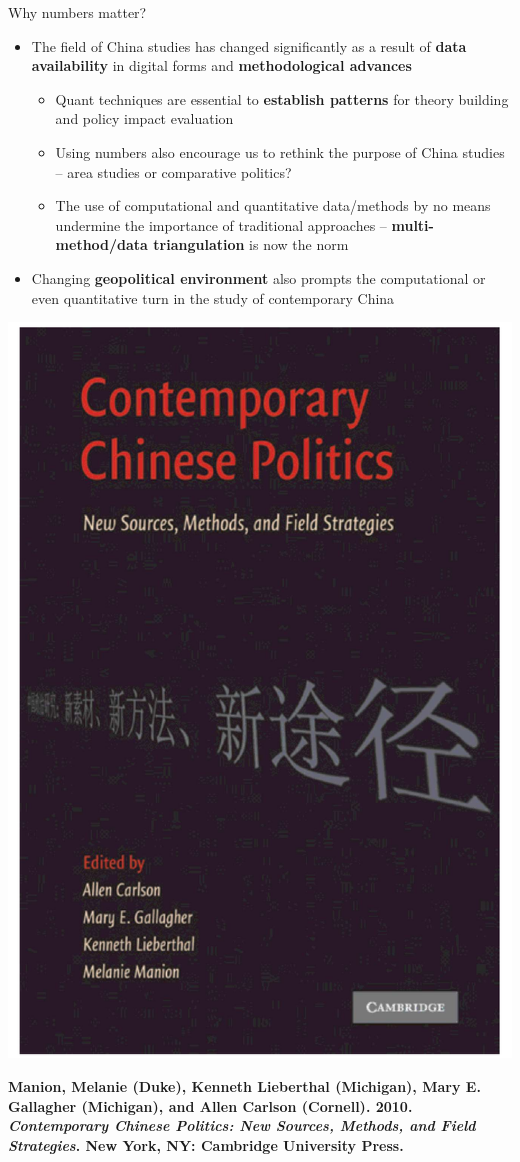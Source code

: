 \documentclass[
  10pt,
  ignorenonframetext,
]{beamer}
\begin{document}
\begin{frame}{Why numbers matter?}
\label{why-numbers-matter}
\begin{itemize}
\small
  \item The field of China studies has changed significantly as a result of \textbf{data availability} in digital forms and \textbf{methodological advances} 
  \vspace{0.1cm}
  \begin{itemize}
    \item Quant techniques are essential to \textbf{establish patterns} for theory building and policy impact evaluation
    \item Using numbers also encourage us to rethink the purpose of China studies -- area studies or comparative politics?
    \item The use of computational and quantitative data/methods by no means undermine the importance of traditional approaches -- \textbf{multi-method/data triangulation} is now the norm
  \end{itemize}
  \vspace{0.3cm}
  \item Changing \textbf{geopolitical environment} also prompts the computational or even quantitative turn in the study of contemporary China
\end{itemize}
\end{frame}

\begin{frame}
\vspace{0.4cm}

\begin{center}\includegraphics[width=0.35\linewidth]{Figs/book_crop} \end{center}
\vspace{0.2cm}
\begin{center}
\scriptsize
\textbf{Manion, Melanie (Duke), Kenneth Lieberthal (Michigan), Mary E. Gallagher (Michigan), and Allen Carlson (Cornell). 2010. \textit{Contemporary Chinese Politics: New Sources, Methods, and Field Strategies}. New York, NY: Cambridge University Press.}
\end{center}
\end{frame}
\end{document}
